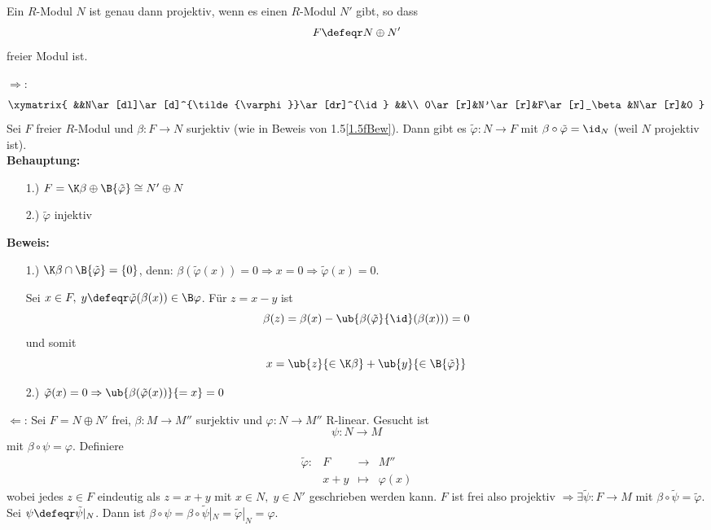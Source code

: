 \begin{Prop}
\label{1.6}
  Ein $R$-Modul $N$ ist genau dann projektiv, wenn es einen $R$-Modul $N'$ gibt,
  so dass 
  \[
  F \defeqr N \oplus N'
  \]
  freier Modul ist.
\end{Prop}

\begin{Bew}
  \glqq$\Rightarrow$\grqq:
  \[\xymatrix{
  &&N\ar[dl]\ar[d]^{\tilde{\varphi}}\ar[dr]^{\id} &&\\
  0\ar[r]&N'\ar[r]&F\ar[r]_\beta&N\ar[r]&0 
  }\]
  Sei $F$ freier $R$-Modul und $\beta: F \to N$ surjektiv (wie in Beweis von
  1.5\ref{1.5fBew}). Dann gibt es $\tilde{\varphi}: N \to F$ mit $\beta \circ
  \tilde{\varphi} = \id_N$ (weil $N$ projektiv ist).\\
  \textbf{Behauptung:}
  \begin{enumerate}
    \item[1.)] $F = \K\beta \oplus \B{\tilde{\varphi}} \cong
               N' \oplus N$
    \item[2.)] $\tilde{\varphi}$ injektiv
  \end{enumerate}
  \textbf{Beweis:}
  \begin{enumerate}
    \item[1.)] $\K\beta \cap \B{\tilde{\varphi}} = \{0\}$, denn:
               $\beta(\tilde{\varphi}(x)) = 0 \Rightarrow x = 0 \Rightarrow
               \tilde{\varphi}(x) = 0$.
  
               Sei $x \in F,\; y \defeqr
               \tilde{\varphi}(\beta(x)) \in \B\varphi$.
               Für $z = x - y$ ist
               \[
               \beta(z) = \beta(x) -
               \ub{\beta(\tilde{\varphi}}{\id}(\beta(x)))= 0
               \]
               und somit
               \[ 
               x = \ub{z}{\in
               \K\beta} + \ub{y}{\in \B{\tilde{\varphi}}}
               \]
    \item[2.)] $\tilde{\varphi}(x) = 0 \Rightarrow \ub{\beta(\tilde{\varphi}(x))}{= x} = 0$
  \end{enumerate}
  \glqq$\Leftarrow$\grqq:
  Sei $F = N \oplus N'$ frei, $\beta: M \to M''$ surjektiv und $\varphi: N \to
  M''$ R-linear. Gesucht ist 
  \[
  \psi: N \to M
  \]
  mit $\beta \circ \psi = \varphi$.
  Definiere 
  \[
  \begin{matrix}
  \tilde{\varphi}:& F& \to& M''\\
  &x + y &\mapsto&\varphi(x)
  \end{matrix}
  \]
  wobei jedes $z \in F$ eindeutig als $z = x + y$ mit $x \in N,\; y
  \in N'$ geschrieben werden kann.
  $F$ ist frei also projektiv $\Rightarrow \exists \tilde{\psi}: F \to M$ mit
  $\beta \circ \tilde{\psi} = \tilde{\varphi}$. Sei $\psi \defeqr
  \tilde{\psi}|_N$. Dann ist $\beta \circ \psi = \beta \circ \tilde{\psi}|_N =
  \tilde{\varphi}|_N = \varphi$.
\end{Bew}
